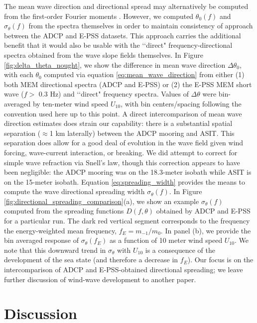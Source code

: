 \documentclass[letterpaper,journal]{IEEEtran}
\begin{document}
The mean wave direction and directional spread may alternatively be computed from the first-order Fourier moments \cite{earle_nondirectional_2003}. However, we computed $\theta_0(f)$ and $\sigma_\theta(f)$ from the spectra themselves in order to maintain consistency of approach between the ADCP and E-PSS datasets. This approach carries the additional benefit that it would also be usable with the \lq\lq direct" frequency-directional spectra obtained from the wave slope fields themselves. In Figure \ref{fig:delta_theta_nought}, we show the difference in mean wave direction $\Delta\theta_0$, with each $\theta_0$ computed via equation \ref{eq:mean_wave_direction} from either (1) both MEM directional spectra (ADCP and E-PSS) or (2) the E-PSS MEM short wave ($f>$ 0.3 Hz) and \lq\lq direct" frequency spectra. Values of $\Delta\theta$ were bin-averaged by ten-meter wind speed $U_{10}$, with bin centers/spacing following the convention used here up to this point. A direct intercomparison of mean wave direction estimates does strain our capability: there is a substantial spatial separation ($\approx$1 km laterally) between the ADCP mooring and ASIT. This separation does allow for a good deal of evolution in the wave field given wind forcing, wave-current interaction, or breaking. We did attempt to correct for simple wave refraction via Snell's law, though this correction appears to have been negligible: the ADCP mooring was on the 18.3-meter isobath while ASIT is on the 15-meter isobath. Equation \ref{eq:spreading_width} provides the means to compute the wave directional spreading width $\sigma_\theta(f)$. In Figure \ref{fig:directional_spreading_comparison}(a), we show an example $\sigma_\theta(f)$ computed from the spreading functions $D(f,\theta)$ obtained by ADCP and E-PSS for a particular run. The dark red vertical segment corresponds to the frequency the energy-weighted mean frequency, $f_E=m_{-1}/m_{0}$. In panel (b), we provide the bin averaged response of $\sigma_\theta(f_E)$ as a function of 10 meter wind speed $U_{10}$. We note that this downward trend in $\sigma_\theta$ with $U_{10}$ is a consequence of the development of the sea state (and therefore a decrease in $f_E$). Our focus is on the intercomparison of ADCP and E-PSS-obtained directional spreading; we leave further discussion of wind-wave development to another paper.

\newpage


\section{Discussion}
\label{sec:discussion}
\end{document}
